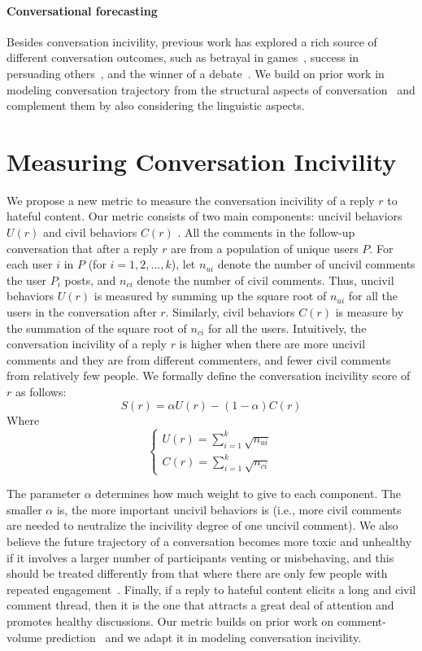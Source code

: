 \documentclass[11pt]{article}
\begin{document}
	\paragraph{Conversational forecasting}
	Besides conversation incivility, previous work has explored a rich source of different conversation outcomes, such as betrayal in games~\cite{niculae-etal-2015-linguistic}, success in persuading others~\cite{10.1145/2872427.2883081}, and the winner of a debate~\cite{potash-rumshisky-2017-towards}.
	We build on prior work in modeling conversation trajectory from the structural aspects of conversation~\cite{10.1145/2433396.2433401} and complement them by also considering the linguistic aspects.
	
	
	
	\section{Measuring Conversation Incivility} %
	\label{s:metric}
	We propose a new metric to measure the conversation incivility of a reply $r$ to hateful content.
	Our metric consists of two main components: uncivil behaviors $U(r)$ and civil behaviors $C(r)$ .
	All the comments in the follow-up conversation that after a reply $r$ are from a population of unique users $P$.
	For each user $i$ in $P$ (for $i = 1,2,...,k$), let $n_{ui}$ denote the number of uncivil comments the user $P_i$ posts, and $n_{ci}$ denote the number of civil comments.
	Thus, uncivil behaviors $U(r)$ is measured by summing up the square root of $n_{ui}$ for all the users in the conversation after $r$.
	Similarly, civil behaviors $C(r)$ is measure by the summation of the square root of $n_{ci}$ for all the users.
	Intuitively, the conversation incivility of a reply $r$ is higher when there are more uncivil comments and they are from different commenters, and fewer civil comments from relatively few people.
	We formally define the conversation incivility score of $r$ as follows:
	$$S(r) = \alpha U(r) - (1-\alpha) C(r)$$
	Where
	\[
	\begin{cases}
		 U(r) =	\sum_{i=1}^{k} \sqrt{n_{ui}} \\
	     C(r) =	\sum_{i=1}^{k} \sqrt{n_{ci}} 
	\end{cases}
	\]
	
	The parameter $\alpha$ determines how much weight to give to each component.
	The smaller $\alpha$ is, the more important uncivil behaviors is (i.e., more civil comments are needed to neutralize the incivility degree of one uncivil comment).
	We also believe the future trajectory of a conversation becomes more toxic and unhealthy if it involves a larger number of participants venting or misbehaving, and this should be treated differently from that where there are only few people with repeated engagement~\cite{10.1145/2433396.2433401}.
	Finally, if a reply to hateful content elicits a long and civil comment thread, then it is the one that attracts a great deal of attention and promotes healthy discussions. 
	Our metric builds on prior work on comment-volume prediction~\cite{artzi-etal-2012-predicting,10.1145/2433396.2433401} and we adapt it in modeling conversation incivility.
	
\end{document}
